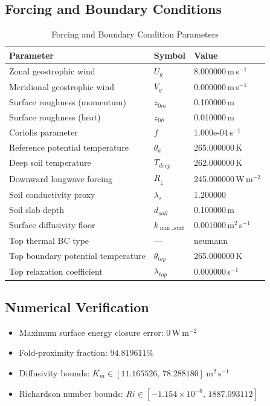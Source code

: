 \subsection{Forcing and Boundary Conditions}
\begin{table}[htbp]
\centering
\caption{Forcing and Boundary Condition Parameters}
\label{tab:scm_parameters_gabls1_gabls1_80x2m_9h_report}
\begin{tabular}{lll}
\hline
{\bfseries Parameter} & {\bfseries Symbol} & {\bfseries Value} \\
\hline
Zonal geostrophic wind & $U_g$ & 8.000000\,m\,s$^{-1}$ \\
Meridional geostrophic wind & $V_g$ & 0.000000\,m\,s$^{-1}$ \\
Surface roughness (momentum) & $z_{0m}$ & 0.100000\,m \\
Surface roughness (heat) & $z_{0h}$ & 0.010000\,m \\
Coriolis parameter & $f$ & 1.000e-04\,s$^{-1}$ \\
Reference potential temperature & $\theta_a$ & 265.000000\,K \\
Deep soil temperature & $T_{deep}$ & 262.000000\,K \\
Downward longwave forcing & $R_{\downarrow}$ & 245.000000\,W\,m$^{-2}$ \\
Soil conductivity proxy & $\lambda_s$ & 1.200000 \\
Soil slab depth & $d_{soil}$ & 0.100000\,m \\
Surface diffusivity floor & $k_{\min,\mathrm{surf}}$ & 0.001000\,m$^2$\,s$^{-1}$ \\
Top thermal BC type & --- & neumann \\
Top boundary potential temperature & $\theta_{top}$ & 265.000000\,K \\
Top relaxation coefficient & $\lambda_{top}$ & 0.000000\,s$^{-1}$ \\
\hline
\end{tabular}
\end{table}

\subsection{Numerical Verification}
\begin{itemize}
  \item Maximum surface energy closure error:
  $0\,\mathrm{W\,m^{-2}}$
  \item Fold-proximity fraction:
  $94.819611\%$
  \item Diffusivity bounds:
  $K_m \in [11.165526,\,78.288180]~\mathrm{m^2\,s^{-1}}$
  \item Richardson number bounds:
  $Ri \in [-1.154 \times 10^{-6},\,1887.093112]$
\end{itemize}

